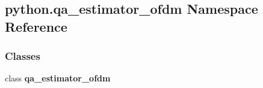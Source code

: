 \subsection{python.\+qa\+\_\+estimator\+\_\+ofdm Namespace Reference}
\label{namespacepython_1_1qa__estimator__ofdm}
\subsubsection*{Classes}
\begin{DoxyCompactItemize}
\item 
class {\bf qa\+\_\+estimator\+\_\+ofdm}
\end{DoxyCompactItemize}
